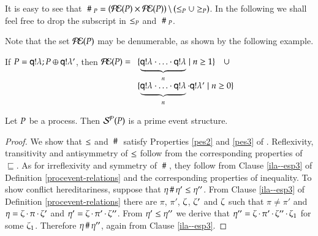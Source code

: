 It is easy to see that $~\#~_{P} = (\mathcal{P\!E}(P)\times \mathcal{P\!E}(P))
\,\backslash \, (\leq_{P} \cup \geq_{P})$.
%
In the following we shall feel free to drop the subscript in
$\leq_{P}$ and $~\#~_{P}$.
\bigskip

Note that the set $\mathcal{P\!E}(P)$ may be denumerable, as shown by the following example.  
\begin{example}
If  $P={\sf q}!\lambda;P \oplus{\sf q}!\lambda'$, 
then 
$ \mathcal{P\!E}(P)  = \begin{array}[t]{l}
\{\underbrace{{\sf q}!\lambda\cdot\ldots\cdot{\sf q}!\lambda}_n \mid
  n\geq 1\} \quad \cup \\
\{\underbrace{{\sf q}!\lambda\cdot\ldots\cdot{\sf q}!\lambda}_n\cdot{\sf q}!\lambda'\mid
  n\geq 0\} 
\end{array} $
\end{example}


\begin{proposition}
  Let $P$ be a process. Then $\mathcal{S^P}(P)$ is a prime event structure.
\end{proposition}
\begin{proof} We show that $\leq$ and $~\#~$ satisfy Properties
  \ref{pes2} and \ref{pes3} of .  Reflexivity,
  transitivity and antisymmetry of $\leq$ follow from the
  corresponding properties of $\sqsubseteq$. As for irreflexivity and
  symmetry of $~\#~$, they follow from Clause \ref{ila--esp3} of
  Definition \ref{procevent-relations} and the corresponding
  properties of inequality.  To show conflict hereditariness, suppose
  that $\eta \,\#\, \eta'\leq \eta''$.  From Clause
  \ref{ila--esp3} of Definition \ref{procevent-relations} there are
  $\pi$, $\pi'$, $\zeta$, $\zeta'$ and $\zeta$ such that
  $\pi\neq\pi'$ and $\eta=\zeta\,{\cdot}\,\pi\,{\cdot}\,\zeta'$
  and $\eta'=\zeta\,{\cdot}\,\pi'\,{\cdot}\,\zeta''$.  From
  $\eta'\leq \eta''$ we derive that
  $\eta''=\zeta\,{\cdot}\,\pi'\,{\cdot}\,\zeta''\,{\cdot}\,\zeta_1$
  for some $\zeta_1$.  Therefore $\eta \,\#\, \eta''$, again
  from Clause \ref{ila--esp3}.
 \end{proof}

%